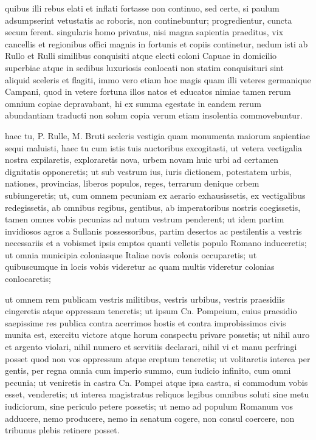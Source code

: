  quibus illi rebus elati et inflati fortasse non continuo, sed certe, si paulum adsumpserint vetustatis ac roboris, non continebuntur; progredientur, cuncta secum ferent. singularis homo privatus, nisi magna sapientia praeditus, vix cancellis et regionibus offici magnis in fortunis et copiis continetur, nedum isti ab Rullo et Rulli similibus conquisiti atque electi coloni Capuae in domicilio superbiae atque in sedibus luxuriosis conlocati non statim conquisituri sint aliquid sceleris et flagiti, immo vero etiam hoc magis quam illi veteres germanique Campani, quod in vetere fortuna illos natos et educatos nimiae tamen rerum omnium copiae depravabant, hi ex summa egestate in eandem rerum abundantiam traducti non solum copia verum etiam insolentia commovebuntur.

 haec tu, P. Rulle, M. Bruti sceleris vestigia quam monumenta maiorum sapientiae sequi maluisti, haec tu cum istis tuis auctoribus excogitasti, ut vetera vectigalia nostra expilaretis, exploraretis nova, urbem novam huic urbi ad certamen dignitatis opponeretis; ut sub vestrum ius, iuris dictionem, potestatem urbis, nationes, provincias, liberos populos, reges, terrarum denique orbem subiungeretis; ut, cum omnem pecuniam ex aerario exhausissetis, ex vectigalibus redegissetis, ab omnibus regibus, gentibus, ab imperatoribus nostris coegissetis, tamen omnes vobis pecunias ad nutum vestrum penderent; ut idem partim invidiosos agros a Sullanis possessoribus, partim desertos ac pestilentis a vestris necessariis et a vobismet ipsis emptos quanti velletis populo Romano induceretis; ut omnia municipia coloniasque Italiae novis colonis occuparetis; ut quibuscumque in locis vobis videretur ac quam multis videretur colonias conlocaretis;

 ut omnem rem publicam vestris militibus, vestris urbibus, vestris praesidiis cingeretis atque oppressam teneretis; ut ipsum Cn. Pompeium, cuius praesidio saepissime res publica contra acerrimos hostis et contra improbissimos civis munita est, exercitu victore atque horum conspectu privare possetis; ut nihil auro et argento violari, nihil numero et servitiis declarari, nihil vi et manu perfringi posset quod non vos oppressum atque ereptum teneretis; ut volitaretis interea per gentis, per regna omnia cum imperio summo, cum iudicio infinito, cum omni pecunia; ut veniretis in castra Cn. Pompei atque ipsa castra, si commodum vobis esset, venderetis; ut interea magistratus reliquos legibus omnibus soluti sine metu iudiciorum, sine periculo petere possetis; ut nemo ad populum Romanum vos adducere, nemo producere, nemo in senatum cogere, non consul coercere, non tribunus plebis retinere posset.

